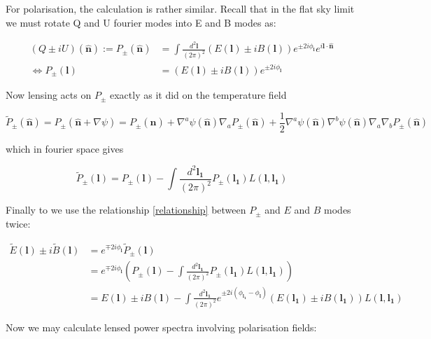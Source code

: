 \documentclass[a4paper,10pt]{article}
\renewcommand{\v}[1]{\mathbf{#1}}
\newcommand{\half}{\frac{1}{2}}
\newcommand{\finttwo}[1]{\int \frac{d^2 \v{#1}}{(2\pi)^2}}
\newcommand{\unit}[1]{\hat{\v{#1}}}
\begin{document}
For polarisation, the calculation is rather similar. Recall that in the flat sky limit we must rotate Q and U fourier modes into E and B modes as:

\begin{equation}\begin{split}
(Q\pm iU)(\unit{n}) := P_{\pm} (\unit{n}) &= \finttwo{l}(E(\v{l})\pm i B(\v{l}))e^{\pm 2i\phi_{\v{l}}}e^{i\v{l}\cdot\unit{n}}\\
\Leftrightarrow  P_{\pm}(\v{l}) &= (E(\v{l})\pm i B(\v{l}))e^{\pm 2i\phi_{\v{l}}}
\label{relationship}
\end{split}\end{equation}

Now lensing acts on $P_{\pm}$ exactly as it did on the temperature field 

\begin{equation}
\tilde{P}_{\pm}(\unit{n}) = P_{\pm}(\unit{n}+\nabla\psi) =P_{\pm}(\unit{n})+\nabla^a\psi(\unit{n})\nabla_aP_{\pm}(\unit{n})+\half\nabla^a\psi(\unit{n})\nabla^b\psi(\unit{n})\nabla_a\nabla_bP_{\pm}(\unit{n})
\end{equation}

which in fourier space gives

\begin{equation}
\tilde{P}_{\pm}(\v{l}) = P_{\pm}(\v{l}) - \finttwo{l_1} P_{\pm}(\v{l_1})L(\v{l},\v{l_1})
\end{equation}

Finally to we use the relationship \ref{relationship} between $P_\pm$ and $E$ and $B$ modes twice:

\begin{equation}\begin{split}
\tilde{E}(\v{l})\pm i\tilde{B}(\v{l}) &= e^{\mp 2i\phi_\v{l}}\tilde{P}_{\pm}(\v{l})\\
&=e^{\mp 2i\phi_\v{l}}(P_{\pm}(\v{l}) - \finttwo{l_1} P_{\pm}(\v{l_1})L(\v{l},\v{l_1}))\\
&=E(\v{l})\pm iB(\v{l})-\finttwo{l_1} e^{\pm 2i(\phi_\v{l_1}-\phi_\v{l})}(E(\v{l_1})\pm iB(\v{l_1}))L(\v{l},\v{l_1})
\label{lensedEBmodes}
\end{split}\end{equation}



Now we may calculate lensed power spectra involving polarisation fields:
\end{document}

